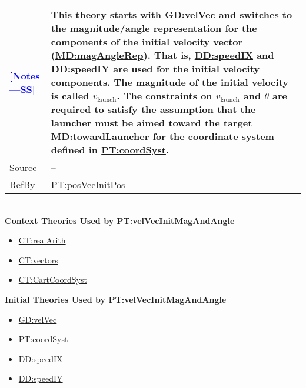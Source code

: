 \documentclass[12pt]{article}
\newcommand{\authornote}[3]{\textcolor{#1}{[#3 ---#2]}}
\newcommand{\authornote}[3]{}
\newcommand{\wss}[1]{\authornote{blue}{SS}{#1}}
\begin{document}
\begin{minipage}{\textwidth}
\begin{tabular}{>{\raggedright}p{}>{\raggedright\arraybackslash}p{}}
\\ \midrule \wss{Notes} & This theory starts with
\hyperref[GD:velVec]{GD:velVec} and switches to the magnitude/angle
representation for the components of the initial velocity vector
(\hyperref[MD:magAngleRep]{MD:magAngleRep}).  That is,
\hyperref[DD:speedIX]{DD:speedIX} and \hyperref[DD:speedIY]{DD:speedIY} are used
for the initial velocity components. The magnitude of the initial velocity is
called $v_\text{launch}$.  The constraints on $v_\text{launch}$ and $\theta$ are
required to satisfy the assumption that the launcher must be aimed toward the
target \hyperref[MD:towardLauncher]{MD:towardLauncher} for the coordinate system
defined in \hyperref[PT:coordSyst]{PT:coordSyst}.

\\ \midrule
Source & --
         
\\ \midrule
RefBy & \hyperref[PT:posVecInitPos]{PT:posVecInitPos}

\\ \bottomrule
\end{tabular}
\end{minipage}
~\\

\noindent \textbf{Context Theories Used by PT:velVecInitMagAndAngle}

\begin{itemize}
\item \hyperref[CT:realArith]{CT:realArith}
\item \hyperref[CT:vectors]{CT:vectors}
\item \hyperref[CT:CartCoordSyst]{CT:CartCoordSyst}
\end{itemize}

\noindent \textbf{Initial Theories Used by PT:velVecInitMagAndAngle}

\begin{itemize}
\item \hyperref[GD:velVec]{GD:velVec}
\item \hyperref[PT:coordSyst]{PT:coordSyst}
\item \hyperref[DD:speedIX]{DD:speedIX}
\item \hyperref[DD:speedIY]{DD:speedIY}
\end{itemize}
\end{document}
